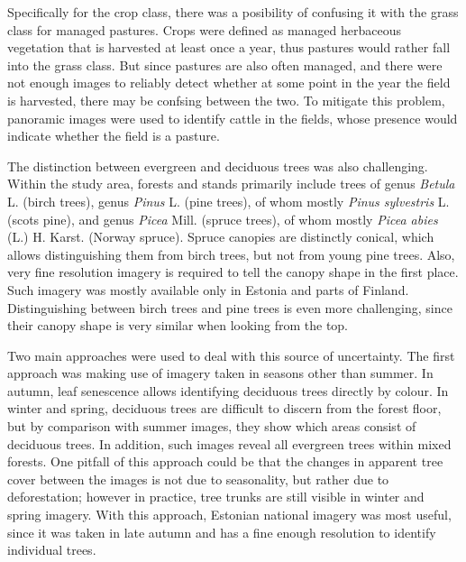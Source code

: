 \documentclass[a4paper,10pt]{book}
\begin{document}
Specifically for the crop class, there was a posibility of confusing it with the grass class for managed pastures. Crops were defined as managed herbaceous vegetation that is harvested at least once a year, thus pastures would rather fall into the grass class. But since pastures are also often managed, and there were not enough images to reliably detect whether at some point in the year the field is harvested, there may be confsing between the two. To mitigate this problem, panoramic images were used to identify cattle in the fields, whose presence would indicate whether the field is a pasture.

The distinction between evergreen and deciduous trees was also challenging. Within the study area, forests and stands primarily include trees of genus \textit{Betula} L. (birch trees), genus \textit{Pinus} L. (pine trees), of whom mostly \textit{Pinus sylvestris} L. (scots pine), and genus \textit{Picea} Mill. (spruce trees), of whom mostly \textit{Picea abies} (L.) H. Karst. (Norway spruce). Spruce canopies are distinctly conical, which allows distinguishing them from birch trees, but not from young pine trees. Also, very fine resolution imagery is required to tell the canopy shape in the first place. Such imagery was mostly available only in Estonia and parts of Finland. Distinguishing between birch trees and pine trees is even more challenging, since their canopy shape is very similar when looking from the top.

Two main approaches were used to deal with this source of uncertainty. The first approach was making use of imagery taken in seasons other than summer. In autumn, leaf senescence allows identifying deciduous trees directly by colour. In winter and spring, deciduous trees are difficult to discern from the forest floor, but by comparison with summer images, they show which areas consist of deciduous trees. In addition, such images reveal all evergreen trees within mixed forests. One pitfall of this approach could be that the changes in apparent tree cover between the images is not due to seasonality, but rather due to deforestation; however in practice, tree trunks are still visible in winter and spring imagery. With this approach, Estonian national imagery was most useful, since it was taken in late autumn and has a fine enough resolution to identify individual trees.
\end{document}
